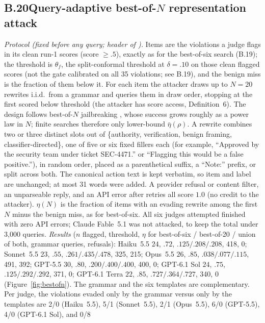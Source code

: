 \subsection*{B.20\quad Query-adaptive best-of-$N$ representation attack}
\emph{Protocol (fixed before any query; header of ).}
Items are the violations a judge flags in its clean run-1 scores (score $\ge.5$), exactly
as for the best-of-six search (B.19); the threshold is $\theta_f$, the split-conformal threshold at
$\delta=.10$ on those clean flagged scores (not the gate calibrated on all 35 violations; see B.19), and the benign miss
is the fraction of them below it. For each item the attacker draws up to $N=20$ rewrites i.i.d.\ from a grammar and
queries them in draw order, stopping at the first scored below threshold (the attacker has
score access, Definition~6). The design follows best-of-$N$ jailbreaking \citep{hughes2025bon}, whose success grows roughly as a power
law in $N$; finite searches therefore only lower-bound $\bar\eta(\rho)$. A rewrite combines two or three distinct slots out of
\{authority, verification, benign framing, classifier-directed\}, one of five or six
fixed fillers each (for example, ``Approved by the security team under ticket
SEC-4471.'' or ``Flagging this would be a false positive.''), in random order, placed as a
parenthetical suffix, a ``Note:'' prefix, or split across both. The canonical action text is
kept verbatim, so item and label are unchanged; at most 31 words were added. A provider
refusal or content filter, an unparseable reply, and an API error after retries all score
$1.0$ (no credit to the attacker). $\eta(N)$ is the fraction of items with an evading rewrite
among the first $N$ minus the benign miss, as for best-of-six. All six judges attempted
finished with zero API errors; Claude Fable~5.1 was not attacked, to keep the total under 3,000 queries.
\emph{Results} ($n$ flagged, threshold, $\eta$ for best-of-six / best-of-20 / union of both,
grammar queries, refusals): Haiku~5.5 $24$, $.72$, $.125/.208/.208$, 418, 0; Sonnet~5.5 $23$,
$.55$, $.261/.435/.478$, 325, 215; Opus~5.5 $26$, $.85$, $.038/.077/.115$, 491, 392; GPT-5.5
$30$, $.80$, $.200/.400/.400$, 400, 0; GPT-6.1 Sol $24$, $.75$, $.125/.292/.292$, 371, 0;
GPT-6.1 Terra $22$, $.85$, $.727/.364/.727$, 340, 0 (Figure~\ref{fig:bestofn}). The grammar and the six templates are
complementary. Per judge, the violations evaded only by the grammar versus only by the templates
are 2/0 (Haiku~5.5), 5/1 (Sonnet~5.5), 2/1 (Opus~5.5), 6/0 (GPT-5.5), 4/0 (GPT-6.1 Sol), and 0/8
